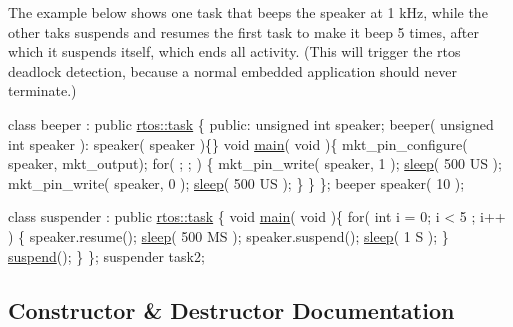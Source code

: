 The example below shows one task that beeps the speaker at 1 k\+Hz, while the other taks suspends and resumes the first task to make it beep 5 times, after which it suspends itself, which ends all activity. (This will trigger the rtos deadlock detection, because a normal embedded application should never terminate.)


\begin{DoxyCode}
\textcolor{keyword}{class }beeper : \textcolor{keyword}{public} \hyperlink{classrtos_1_1task}{rtos::task} \{
\textcolor{keyword}{public}:
   \textcolor{keywordtype}{unsigned} \textcolor{keywordtype}{int} speaker;
   beeper( \textcolor{keywordtype}{unsigned} \textcolor{keywordtype}{int} speaker ): speaker( speaker )\{\}
   \textcolor{keywordtype}{void} \hyperlink{classrtos_1_1task__base_a35016dfecdd20ce4786ef7a16154976a}{main}( \textcolor{keywordtype}{void} )\{
      mkt\_pin\_configure( speaker, mkt\_output);
      \textcolor{keywordflow}{for}( ; ; ) \{
         mkt\_pin\_write( speaker, 1  );
         \hyperlink{classrtos_1_1task__base_a1110fdfe776e7f256eb809216e97c836}{sleep}( 500 US );
         mkt\_pin\_write( speaker, 0  );
         \hyperlink{classrtos_1_1task__base_a1110fdfe776e7f256eb809216e97c836}{sleep}( 500 US );
      \}
   \}
\};
beeper speaker( 10 );

\textcolor{keyword}{class }suspender : \textcolor{keyword}{public} \hyperlink{classrtos_1_1task}{rtos::task} \{
   \textcolor{keywordtype}{void} \hyperlink{classrtos_1_1task__base_a35016dfecdd20ce4786ef7a16154976a}{main}( \textcolor{keywordtype}{void} )\{
      \textcolor{keywordflow}{for}( \textcolor{keywordtype}{int} i = 0; i < 5 ; i++ ) \{
         speaker.resume();
         \hyperlink{classrtos_1_1task__base_a1110fdfe776e7f256eb809216e97c836}{sleep}( 500 MS );
         speaker.suspend();
         \hyperlink{classrtos_1_1task__base_a1110fdfe776e7f256eb809216e97c836}{sleep}( 1 S );
      \}
      \hyperlink{classrtos_1_1task__base_a2e5c57f7993ffa43c91348277ec2478c}{suspend}();
   \}
\};
suspender task2;
\end{DoxyCode}
 

\subsection{Constructor \& Destructor Documentation}
